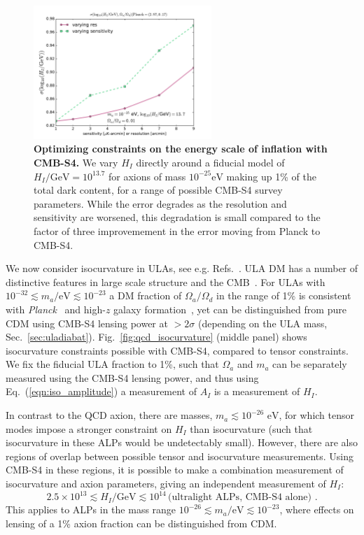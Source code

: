 \begin{figure}[htbp!]
\begin{center}
\includegraphics[width=0.6\textwidth]{Inflation/ALP_iso_mass_m25_Hi_sensitivity_resolution.pdf}
\caption{\textbf{Optimizing constraints on the energy scale of inflation with CMB-S4.} We vary $H_I$ directly around a fiducial model of $H_I/\text{GeV} = 10^{13.7}$ for axions of mass $10^{-25} \mathrm{eV}$ making up 1\% of the total dark content, for a range of possible CMB-S4 survey parameters. While the error degrades as the resolution and sensitivity are worsened, this degradation is small compared to the factor of three improvemement in the error moving from Planck to CMB-S4. \label{fig:optimize_axioniso}}
\end{center}
\end{figure}

We now consider isocurvature in ULAs, see e.g. Refs.~\cite{Marsh:2013taa,Marsh:2014qoa}. ULA DM has a number of distinctive features in large scale structure and the CMB~\cite{Hlozek:2014lca,Marsh:2013ywa}. For ULAs with $10^{-32}\lesssim m_a/\text{eV}\lesssim 10^{-23}$ a DM fraction of $\Omega_a/\Omega_d$ in the range of 1\% is consistent with \emph{Planck}~\cite{Hlozek:2014lca} and high-$z$ galaxy formation~\cite{Bozek:2014uqa,Schive:2015kza}, yet can be distinguished from pure CDM using CMB-S4 lensing power at $>2\sigma$ (depending on the ULA mass, Sec.~\ref{sec:uladiabat}). Fig.~\ref{fig:qcd_isocurvature} (middle panel) shows isocurvature constraints possible with CMB-S4, compared to tensor constraints. We fix the fiducial ULA fraction to 1\%, such that $\Omega_a$ and $m_a$ can be separately measured using the CMB-S4 lensing power, and thus using Eq.~(\ref{eqn:iso_amplitude}) a measurement of $A_I$ is a measurement of $H_I$. 

In contrast to the QCD axion, there are masses, $m_a\lesssim 10^{-26}\text{ eV}$, for which tensor modes impose a stronger constraint on $H_I$ than isocurvature (such that isocurvature in these ALPs would be undetectably small). However, there are also regions of overlap between possible tensor and isocurvature measurements. Using CMB-S4 in these regions, it is possible to make a combination measurement of isocurvature and axion parameters, giving an independent measurement of $H_I$:
\begin{equation} 2.5\times 10^{13}\lesssim H_I/\text{GeV}\lesssim 10^{14}\,
\text{(ultralight ALPs, CMB-S4 alone)}\,\,.
\end{equation}
This applies to ALPs in the mass range $10^{-26}\lesssim m_a/\text{eV}\lesssim 10^{-23}$, where effects on lensing of a 1\% axion fraction can be distinguished from CDM. 


